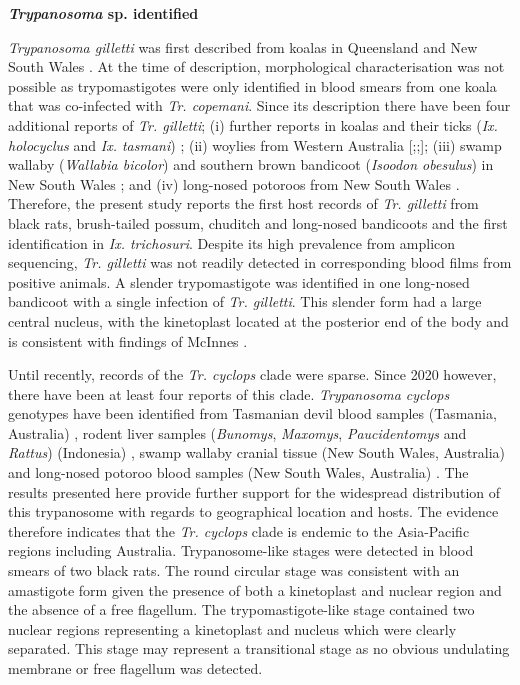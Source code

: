 \documentclass[a4paper, nobind]{templates/ociamthesis}
\begin{document}
\textbf{\emph{Trypanosoma} sp. identified}

\emph{Trypanosoma gilletti} was first described from koalas in Queensland and New South Wales \autocite{mcinnesNovelTrypanosomeTrypanosoma2011}.
At the time of description, morphological characterisation was not possible as trypomastigotes were only identified in blood smears from one koala that was co-infected with \emph{Tr. copemani}.
Since its description there have been four additional reports of \emph{Tr. gilletti}; (i) further reports in koalas and their ticks (\emph{Ix. holocyclus} and \emph{Ix. tasmani}) \autocite{barbosaIncreasedGeneticDiversity2017}; (ii) woylies from Western Australia {[}\textcite{cooperNextGenerationSequencing2018};\textcite{northoverIncreasedTrypanosomaSpp2019};{]}; (iii) swamp wallaby (\emph{Wallabia bicolor}) and southern brown bandicoot (\emph{Isoodon obesulus}) in New South Wales \autocite{ortiz-baezMetatranscriptomicIdentificationTrypanosoma2020}; and (iv) long-nosed potoroos from New South Wales \autocite{hallBaselineHealthParameters2021}.
Therefore, the present study reports the first host records of \emph{Tr. gilletti} from black rats, brush-tailed possum, chuditch and long-nosed bandicoots and the first identification in \emph{Ix. trichosuri}.
Despite its high prevalence from amplicon sequencing, \emph{Tr. gilletti} was not readily detected in corresponding blood films from positive animals.
A slender trypomastigote was identified in one long-nosed bandicoot with a single infection of \emph{Tr. gilletti}.
This slender form had a large central nucleus, with the kinetoplast located at the posterior end of the body and is consistent with findings of McInnes \autocite*{mcinnesNovelTrypanosomeTrypanosoma2011}.

Until recently, records of the \emph{Tr. cyclops} clade were sparse. Since 2020 however, there have been at least four reports of this clade.
\emph{Trypanosoma cyclops} genotypes have been identified from Tasmanian devil blood samples (Tasmania, Australia) \autocite{eganBloodParasitesEndangered2020}, rodent liver samples (\emph{Bunomys}, \emph{Maxomys}, \emph{Paucidentomys} and \emph{Rattus}) (Indonesia) \autocite{winterhoffNativeIntroducedTrypanosome2020}, swamp wallaby cranial tissue (New South Wales, Australia) \autocite{ortiz-baezMetatranscriptomicIdentificationTrypanosoma2020} and long-nosed potoroo blood samples (New South Wales, Australia) \autocite{hallBaselineHealthParameters2021}.
The results presented here provide further support for the widespread distribution of this trypanosome with regards to geographical location and hosts.
The evidence therefore indicates that the \emph{Tr. cyclops} clade is endemic to the Asia-Pacific regions including Australia.
Trypanosome-like stages were detected in blood smears of two black rats.
The round circular stage was consistent with an amastigote form given the presence of both a kinetoplast and nuclear region and the absence of a free flagellum.
The trypomastigote-like stage contained two nuclear regions representing a kinetoplast and nucleus which were clearly separated.
This stage may represent a transitional stage as no obvious undulating membrane or free flagellum was detected.
\end{document}
